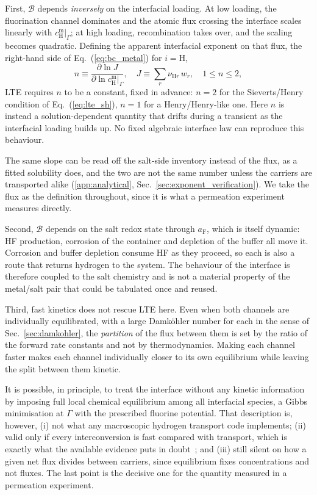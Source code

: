 \documentclass[5p]{elsarticle}
\newcommand{\cm}[1]{c^{\mathrm{m}}_{#1}}   %
\newcommand{\Bra}{\mathcal{B}}             %
\begin{document}
First, $\Bra$ depends \emph{inversely} on the interfacial loading.
At low loading, the fluorination channel dominates and the atomic flux crossing the interface scales linearly with $\cm{\mathrm{H}}\big|_\Gamma$; at high loading, recombination takes over, and the scaling becomes quadratic. 
Defining the apparent interfacial exponent on that flux, the right-hand side of Eq.~(\ref{eq:bc_metal}) for $i = \mathrm{H}$,
\begin{equation}
    n \equiv \frac{\partial \ln J}{\partial \ln \cm{\mathrm{H}}\big|_\Gamma} ,
    \quad J \equiv \sum_r \nu_{\mathrm{H}r}\, w_r ,
    \quad 1 \le n \le 2 ,
    \label{eq:apparent_exponent}
\end{equation}
LTE requires $n$ to be a constant, fixed in advance: $n = 2$ for the Sieverts/Henry condition of Eq.~(\ref{eq:lte_sh}), $n = 1$ for a Henry/Henry-like one.
Here $n$ is instead a solution-dependent quantity that drifts during a transient as the interfacial loading builds up.
No fixed algebraic interface law can reproduce this behaviour.

The same slope can be read off the salt-side inventory instead of the flux, as a fitted solubility does, and the two are not the same number unless the carriers are transported alike (\ref{app:analytical}, Sec.~\ref{sec:exponent_verification}).
We take the flux as the definition throughout, since it is what a permeation experiment measures directly.

Second, $\Bra$ depends on the salt redox state through $a_\mathrm{F}$, which is itself dynamic: HF production, corrosion of the container and depletion of the buffer all move it.
Corrosion and buffer depletion consume HF as they proceed, so each is also a route that returns hydrogen to the system.
The behaviour of the interface is therefore coupled to the salt chemistry and is not a material property of the metal/salt pair that could be tabulated once and reused.

Third, fast kinetics does not rescue LTE here.
Even when both channels are individually equilibrated, with a large Damk\"ohler number for each in the sense of Sec.~\ref{sec:damkohler}, the \emph{partition} of the flux between them is set by the ratio of the forward rate constants and not by thermodynamics.
Making each channel faster makes each channel individually closer to its own equilibrium while leaving the split between them kinetic.

It is possible, in principle, to treat the interface without any kinetic information by imposing full local chemical equilibrium among all interfacial species, a Gibbs minimisation at $\Gamma$ with the prescribed fluorine potential.
That description is, however, (i) not what any macroscopic hydrogen transport code implements; (ii) valid only if every interconversion is fast compared with transport, which is exactly what the available evidence puts in doubt~\cite{hodille_molecular_2022, calderoni_measurement_2008}; and (iii) still silent on how a given net flux divides between carriers, since equilibrium fixes concentrations and not fluxes.
The last point is the decisive one for the quantity measured in a permeation experiment.
\end{document}
